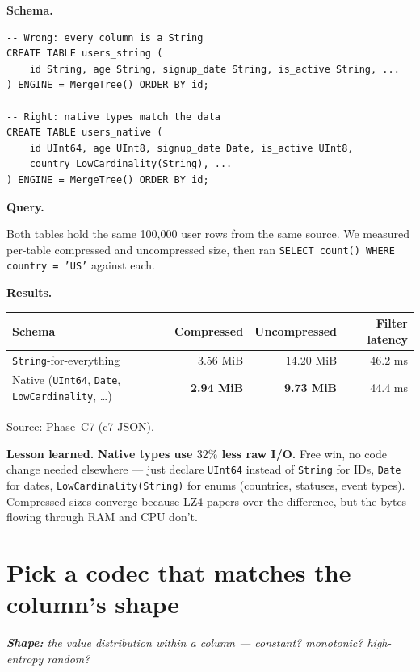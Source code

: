 \documentclass[11pt]{article}
\renewcommand{\arraystretch}{1.15}
\newcommand{\shape}[1]{%
  \par\noindent\textit{\textbf{Shape:} #1}\par\smallskip}
\newcommand{\schemaHd}{%
  \par\smallskip\noindent\textbf{\color{accentblue}Schema.}\par\nopagebreak\smallskip}
\newcommand{\queryHd}{%
  \par\smallskip\noindent\textbf{\color{accentblue}Query.}\par\nopagebreak\smallskip}
\newcommand{\resultsHd}{%
  \par\smallskip\noindent\textbf{\color{accentblue}Results.}\par\nopagebreak\smallskip}
\newcommand{\lesson}[1]{%
  \par\medskip
  \begin{lessonbox}\textbf{\color{accentgreen}Lesson learned.}\enspace #1\end{lessonbox}}
\begin{document}
\schemaHd
\begin{lstlisting}
-- Wrong: every column is a String
CREATE TABLE users_string (
    id String, age String, signup_date String, is_active String, ...
) ENGINE = MergeTree() ORDER BY id;

-- Right: native types match the data
CREATE TABLE users_native (
    id UInt64, age UInt8, signup_date Date, is_active UInt8,
    country LowCardinality(String), ...
) ENGINE = MergeTree() ORDER BY id;
\end{lstlisting}

\queryHd
Both tables hold the same 100{,}000 user rows from the same source.
We measured per-table compressed and uncompressed size, then ran
\texttt{SELECT count() WHERE country = 'US'} against each.

\resultsHd
\renewcommand{\arraystretch}{1.20}
\begin{tabularx}{\linewidth}{@{}X r r r@{}}
\toprule
\textbf{Schema} & \textbf{Compressed} & \textbf{Uncompressed} & \textbf{Filter latency}\\
\midrule
\texttt{String}-for-everything                          & 3.56 MiB & 14.20 MiB & 46.2 ms\\
\rowcolor{accentgreen!12}Native (\texttt{UInt64}, \texttt{Date}, \texttt{LowCardinality}, \ldots)
                                                        & \textbf{2.94 MiB} & \textbf{9.73 MiB} & 44.4 ms\\
\bottomrule
\end{tabularx}

\smallskip
Source: Phase~C7
(\href{run:results/experiment_c7_string_vs_native_20260503_192524.json}{c7 JSON}).

\lesson{%
\textbf{Native types use $32\%$ less raw I/O.} Free win, no code change
needed elsewhere — just declare \texttt{UInt64} instead of \texttt{String}
for IDs, \texttt{Date} for dates, \texttt{LowCardinality(String)} for
enums (countries, statuses, event types). Compressed sizes converge
because LZ4 papers over the difference, but the bytes flowing through
RAM and CPU don't.}

\section{Pick a codec that matches the column's shape}

\shape{the value distribution \emph{within} a column —
constant? monotonic? high-entropy random?}
\end{document}
